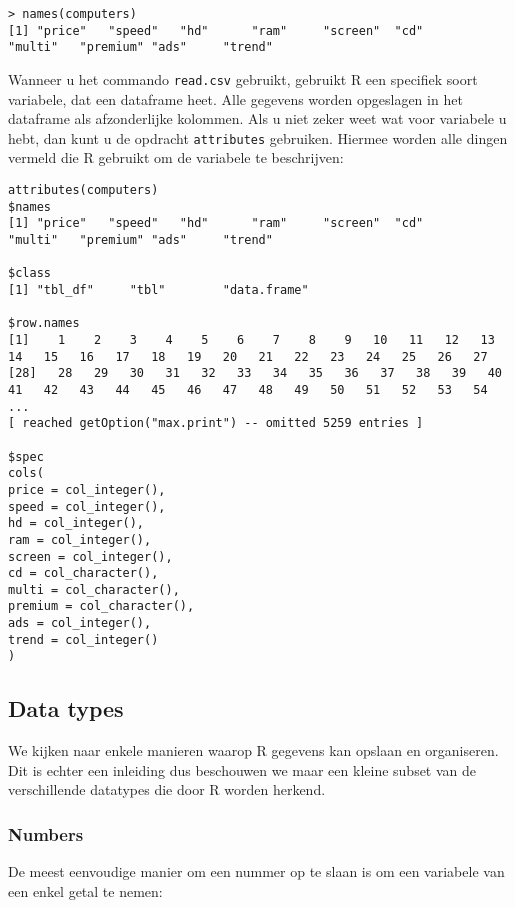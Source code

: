 \begin{lstlisting}
> names(computers)
[1] "price"   "speed"   "hd"      "ram"     "screen"  "cd"      "multi"   "premium" "ads"     "trend"
\end{lstlisting}

Wanneer u het commando \texttt{read.csv} gebruikt, gebruikt R een specifiek soort variabele, dat een dataframe heet. Alle gegevens worden opgeslagen in het dataframe als afzonderlijke kolommen. Als u niet zeker weet wat voor variabele u hebt, dan kunt u de opdracht \texttt{attributes} gebruiken. Hiermee worden alle dingen vermeld die R gebruikt om de variabele te beschrijven:

\begin{lstlisting}
attributes(computers)
$names
[1] "price"   "speed"   "hd"      "ram"     "screen"  "cd"      "multi"   "premium" "ads"     "trend"  

$class
[1] "tbl_df"     "tbl"        "data.frame"

$row.names
[1]    1    2    3    4    5    6    7    8    9   10   11   12   13   14   15   16   17   18   19   20   21   22   23   24   25   26   27
[28]   28   29   30   31   32   33   34   35   36   37   38   39   40   41   42   43   44   45   46   47   48   49   50   51   52   53   54
...
[ reached getOption("max.print") -- omitted 5259 entries ]

$spec
cols(
price = col_integer(),
speed = col_integer(),
hd = col_integer(),
ram = col_integer(),
screen = col_integer(),
cd = col_character(),
multi = col_character(),
premium = col_character(),
ads = col_integer(),
trend = col_integer()
)

\end{lstlisting}

\subsection{Data types}

We kijken naar enkele manieren waarop R gegevens kan opslaan en organiseren. Dit is echter een inleiding dus beschouwen we maar een kleine subset van de verschillende datatypes die door R worden herkend. 

\subsubsection{Numbers}

De meest eenvoudige manier om een nummer op te slaan is om een variabele van een enkel getal te nemen:

